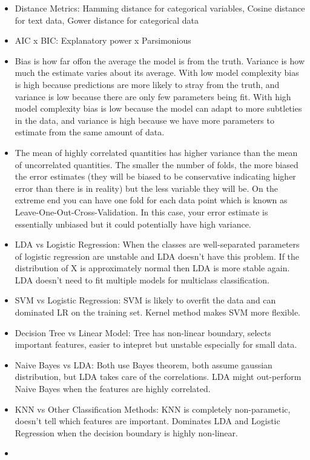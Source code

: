 \documentclass[]{book}
\begin{document}
\begin{itemize}
\item
  Distance Metrics: Hamming distance for categorical variables, Cosine distance for text data, Gower distance for categorical data
\item
  AIC x BIC: Explanatory power x Parsimonious
\item
  Bias is how far offon the average the model is from the truth. Variance is how much the estimate varies about its average. With low model complexity bias is high because predictions are more likely to stray from the truth, and variance is low because there are only few parameters being fit. With high model complexity bias is low because the model can adapt to more subtleties in the data, and variance is high because we have more parameters to estimate from the same amount of data.
\item
  The mean of highly correlated quantities has higher variance than the mean of uncorrelated quantities. The smaller the number of folds, the more biased the error estimates (they will be biased to be conservative indicating higher error than there is in reality) but the less variable they will be. On the extreme end you can have one fold for each data point which is known as Leave-One-Out-Cross-Validation. In this case, your error estimate is essentially unbiased but it could potentially have high variance.
\item
  LDA vs Logistic Regression: When the classes are well-separated parameters of logistic regression are unstable and LDA doesn't have this problem. If the distribution of X is approximately normal then LDA is more stable again. LDA doesn't need to fit multiple models for multiclass classification.
\item
  SVM vs Logistic Regression: SVM is likely to overfit the data and can dominated LR on the training set. Kernel method makes SVM more flexible.
\item
  Decision Tree vs Linear Model: Tree has non-linear boundary, selects important features, easier to intepret but unstable especially for small data.
\item
  Naive Bayes vs LDA: Both use Bayes theorem, both assume gaussian distribution, but LDA takes care of the correlations. LDA might out-perform Naive Bayes when the features are highly correlated.
\item
  KNN vs Other Classification Methods: KNN is completely non-parametic, doesn't tell which features are important. Dominates LDA and Logistic Regression when the decision boundary is highly non-linear.
\item

\end{itemize}
\end{document}
